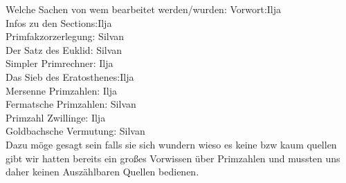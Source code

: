 Welche Sachen von wem bearbeitet werden/wurden:
Vorwort:Ilja\\
Infos zu den Sections:Ilja\\
Primfakzorzerlegung: Silvan\\
Der Satz des Euklid: Silvan\\
Simpler Primrechner: Ilja\\
Das Sieb des Eratosthenes:Ilja\\
Mersenne Primzahlen: Ilja\\
Fermatsche Primzahlen: Silvan\\
Primzahl Zwillinge: Ilja\\
Goldbachsche Vermutung: Silvan\\
Dazu möge gesagt sein falls sie sich wundern wieso es keine bzw kaum quellen gibt wir hatten bereits ein großes Vorwissen über Primzahlen und mussten uns daher keinen Auszählbaren Quellen bedienen.
